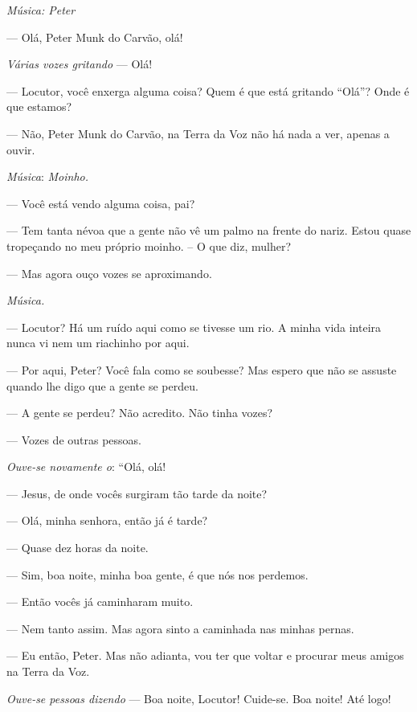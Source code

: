 \begin{myparindent}{0pt}
\begin{Parskip}
\emph{Música: Peter}

 --- Olá, Peter Munk do Carvão, olá!

\emph{Várias vozes gritando} --- Olá!

 --- Locutor, você enxerga alguma coisa? Quem é que
está gritando ``Olá''? Onde é que estamos?

 --- Não, Peter Munk do Carvão, na Terra da Voz não há nada a ver,
apenas a ouvir.

\emph{Música}: \emph{Moinho.}

 --- Você está vendo alguma coisa, pai?

 --- Tem tanta névoa que a gente não vê um palmo na frente do
nariz. Estou quase tropeçando no meu próprio moinho. -- O que diz,
mulher?

 --- Mas agora ouço vozes se aproximando.

\emph{Música.}

 --- Locutor? Há um ruído aqui como se tivesse um
rio. A minha vida inteira nunca vi nem um riachinho por aqui.

 --- Por aqui, Peter? Você fala como se soubesse? Mas espero que
não se assuste quando lhe digo que a gente se perdeu.

 --- A gente se perdeu? Não acredito. Não tinha
vozes?

 --- Vozes de outras pessoas.

\emph{Ouve-se novamente o}: ``Olá, olá!

 --- Jesus, de onde vocês surgiram tão tarde da noite?

 --- Olá, minha senhora, então já é tarde?

 --- Quase dez horas da noite.

 --- Sim, boa noite, minha boa gente, é que nós nos
perdemos.

 --- Então vocês já caminharam muito.

 --- Nem tanto assim. Mas agora sinto a caminhada nas
minhas pernas.

 --- Eu então, Peter. Mas não adianta, vou ter que voltar e
procurar meus amigos na Terra da Voz.

\emph{Ouve-se pessoas dizendo} --- Boa noite, Locutor! Cuide-se. Boa
noite! Até logo!


\end{Parskip}
\end{myparindent}
